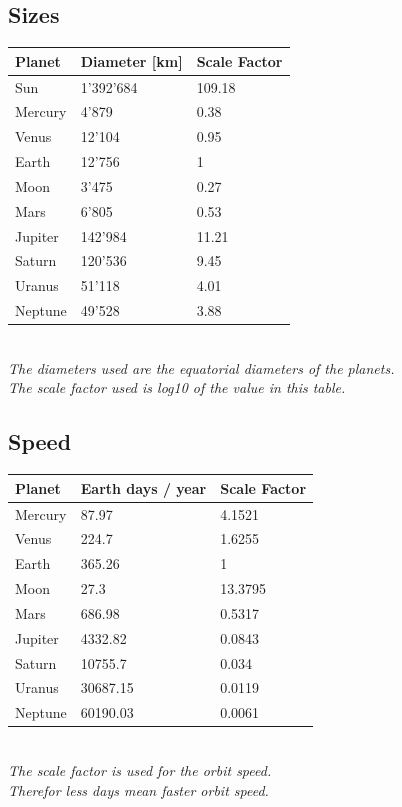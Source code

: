 \subsection{Sizes}
\begin{center}
    \begin{tabular}{| l | l | l |}
    \hline
    Planet & Diameter [km] & Scale Factor \\ \hline
    Sun & 1'392'684 & 109.18 \\ \hline
    Mercury & 4'879 & 0.38 \\ \hline
    Venus & 12'104 & 0.95 \\ \hline
    Earth & 12'756 & 1 \\ \hline
    Moon & 3'475 & 0.27 \\ \hline
    Mars & 6'805 & 0.53 \\ \hline
    Jupiter & 142'984 & 11.21 \\ \hline
    Saturn & 120'536 & 9.45 \\ \hline
    Uranus & 51'118 & 4.01 \\ \hline
    Neptune & 49'528 & 3.88 \\
    \hline
    \end{tabular}\\
    \textit{The diameters used are the equatorial diameters of the planets.\\
    The scale factor used is log10 of the value in this table.}
\end{center}


\subsection{Speed}
\begin{center}
    \begin{tabular}{| l | l | l |}
    \hline
    Planet & Earth days / year & Scale Factor \\ \hline
    Mercury & 87.97 & 4.1521 \\ \hline
    Venus & 224.7 & 1.6255 \\ \hline
    Earth & 365.26 & 1 \\ \hline
    Moon & 27.3 & 13.3795 \\ \hline
    Mars & 686.98 & 0.5317 \\ \hline
    Jupiter & 4332.82 & 0.0843 \\ \hline
    Saturn & 10755.7 & 0.034 \\ \hline
    Uranus & 30687.15 & 0.0119 \\ \hline
    Neptune & 60190.03 & 0.0061 \\
    \hline
    \end{tabular}\\
    \textit{The scale factor is used for the orbit speed.\\
    Therefor less days mean faster orbit speed.}
\end{center}
